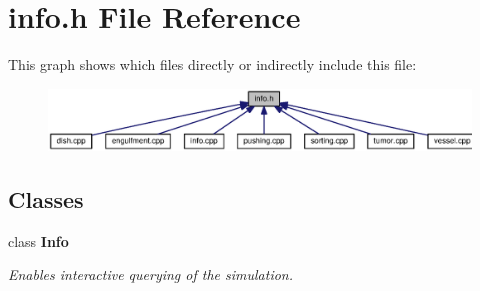 \section{info.\-h File Reference}
\label{info_8h}
This graph shows which files directly or indirectly include this file\-:
\nopagebreak
\begin{figure}[H]
\begin{center}
\leavevmode
\includegraphics[width=350pt]{info_8h__dep__incl}
\end{center}
\end{figure}
\subsection*{Classes}
\begin{DoxyCompactItemize}
\item 
class {\bf Info}
\begin{DoxyCompactList}\small\item\em Enables interactive querying of the simulation. \end{DoxyCompactList}\end{DoxyCompactItemize}
